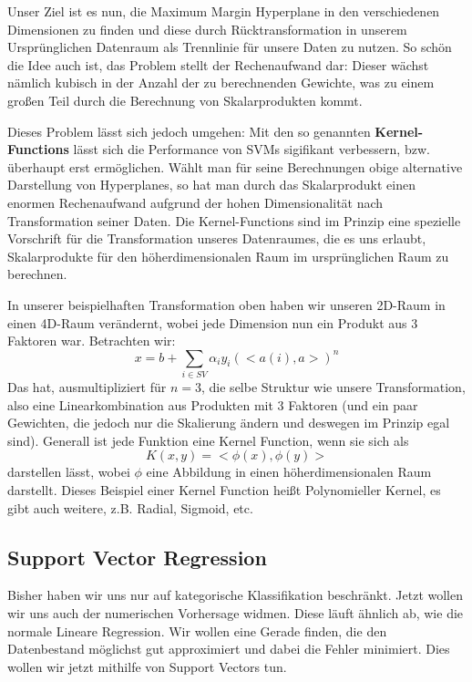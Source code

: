 Unser Ziel ist es nun, die Maximum Margin Hyperplane in den verschiedenen
Dimensionen zu finden und diese durch Rücktransformation in unserem
Ursprünglichen Datenraum als Trennlinie für unsere Daten zu nutzen.
So schön die Idee auch ist, das Problem stellt der Rechenaufwand dar:
Dieser wächst nämlich kubisch in der Anzahl der zu berechnenden 
Gewichte, was zu einem großen Teil durch die Berechnung von 
Skalarprodukten kommt.

Dieses Problem lässt sich jedoch umgehen: Mit den so genannten
\textbf{Kernel-Functions} lässt sich die Performance von SVMs
sigifikant verbessern, bzw. überhaupt erst ermöglichen. Wählt man
für seine Berechnungen obige alternative Darstellung von Hyperplanes,
so hat man durch das Skalarprodukt einen enormen Rechenaufwand 
aufgrund der hohen Dimensionalität nach Transformation seiner Daten.
Die Kernel-Functions sind im Prinzip eine spezielle Vorschrift für die
Transformation unseres Datenraumes, die es uns erlaubt, Skalarprodukte
für den höherdimensionalen Raum im ursprünglichen Raum zu berechnen.

In unserer beispielhaften Transformation oben haben wir unseren
2D-Raum in einen 4D-Raum verändernt, wobei jede Dimension nun
ein Produkt aus 3 Faktoren war. Betrachten wir:
\[x = b + \sum _{i \in SV} \alpha_i y_i (<a(i),a>)^n\]
Das hat, ausmultipliziert für \(n=3\), die selbe Struktur wie 
unsere Transformation,
also eine Linearkombination aus Produkten mit 3 Faktoren (und ein
paar Gewichten, die jedoch nur die Skalierung ändern und deswegen
im Prinzip egal sind). 
Generall ist jede Funktion eine Kernel Function, wenn sie sich als
\[K(x,y) = <\phi(x), \phi(y)>\]
darstellen lässt, wobei \(\phi\) eine Abbildung in einen höherdimensionalen
Raum darstellt. Dieses Beispiel einer Kernel Function heißt Polynomieller
Kernel, es gibt auch weitere, z.B. Radial, Sigmoid, etc.

\subsection{Support Vector Regression}
Bisher haben wir uns nur auf kategorische Klassifikation beschränkt.
Jetzt wollen wir uns auch der numerischen Vorhersage widmen. Diese
läuft ähnlich ab, wie die normale Lineare Regression. Wir wollen eine
Gerade finden, die den Datenbestand möglichst gut approximiert und dabei
die Fehler minimiert. Dies wollen wir jetzt mithilfe von Support Vectors tun.


